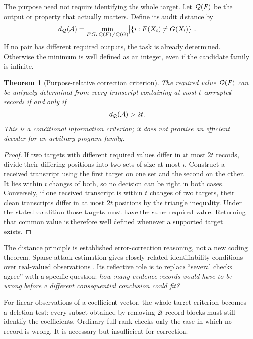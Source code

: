 \documentclass[11pt,letterpaper]{article}
\newtheorem{theorem}{Theorem}[section]
\theoremstyle{remark}\newtheorem{remark}{Remark}[section]
\begin{document}
The purpose need not require identifying the whole target. Let $\mathcal Q(F)$ be the output or property that actually matters. Define its audit distance by
\begin{equation}
 d_{\mathcal Q}(\mathcal A)=\min_{F,G:\,\mathcal Q(F)\ne\mathcal Q(G)}
 \bigl|\{i:F(X_i)\ne G(X_i)\}\bigr|.\label{eq:distance}
\end{equation}
If no pair has different required outputs, the task is already determined. Otherwise the minimum is well defined as an integer, even if the candidate family is infinite.

\begin{theorem}[Purpose-relative correction criterion]\label{thm:distance}
The required value $\mathcal Q(F)$ can be uniquely determined from every transcript containing at most $t$ corrupted records if and only if
\begin{equation}
 d_{\mathcal Q}(\mathcal A)>2t.\label{eq:twot}
\end{equation}
This is a conditional information criterion; it does not promise an efficient decoder for an arbitrary program family.
\end{theorem}
\begin{proof}
If two targets with different required values differ in at most $2t$ records, divide their differing positions into two sets of size at most $t$. Construct a received transcript using the first target on one set and the second on the other. It lies within $t$ changes of both, so no decision can be right in both cases. Conversely, if one received transcript is within $t$ changes of two targets, their clean transcripts differ in at most $2t$ positions by the triangle inequality. Under the stated condition those targets must have the same required value. Returning that common value is therefore well defined whenever a supported target exists.
\end{proof}

The distance principle is established error-correction reasoning, not a new coding theorem. Sparse-attack estimation gives closely related identifiability conditions over real-valued observations \citep{reed,fawzi}. Its reflective role is to replace ``several checks agree'' with a specific question: \emph{how many evidence records would have to be wrong before a different consequential conclusion could fit?}

For linear observations of a coefficient vector, the whole-target criterion becomes a deletion test: every subset obtained by removing $2t$ record blocks must still identify the coefficients. Ordinary full rank checks only the case in which no record is wrong. It is necessary but insufficient for correction.
\end{document}
